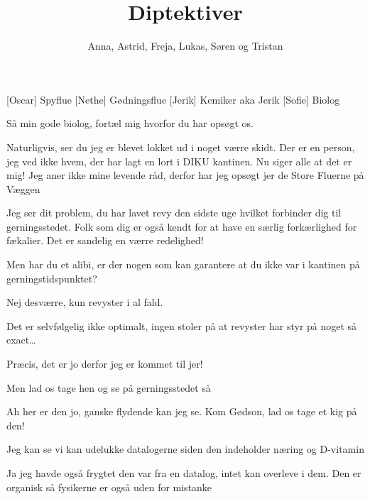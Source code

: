 \documentclass[a4paper,11pt]{article}
\title{Diptektiver}
\author{Anna, Astrid, Freja, Lukas, Søren og Tristan}
\begin{document}
\maketitle

\begin{roles}
    [Oscar] Spyflue
    [Nethe] Gødningsflue
    [Jerik] Kemiker aka Jerik
    [Sofie] Biolog
\end{roles}

\begin{sketch}



 Så min gode biolog, fortæl mig hvorfor du har opsøgt os.

 Naturligvis, ser du jeg er blevet lokket ud i noget værre skidt. Der er en person, jeg ved ikke hvem, der har lagt en lort i DIKU kantinen. Nu siger alle at det er mig! Jeg aner ikke mine levende råd, derfor har jeg opsøgt jer de Store Fluerne på Væggen

 Jeg ser dit problem, du har lavet revy den sidste uge hvilket forbinder dig til gerningsstedet. Folk som dig er også kendt for at have en særlig forkærlighed for fækalier. Det er sandelig en værre redelighed!

 Men har du et alibi, er der nogen som kan garantere at du ikke var i kantinen på gerningstidspunktet?

 Nej desværre, kun revyster i al fald.

 Det er selvfølgelig ikke optimalt, ingen stoler på at revyster har styr på noget så exact…

 Præcis, det er jo derfor jeg er kommet til jer!

 Men lad os tage hen og se på gerningsstedet så


 Ah her er den jo, ganske flydende kan jeg se. Kom Gødson, lad os tage et kig på den!


 Jeg kan se vi kan udelukke datalogerne siden den indeholder næring og D-vitamin

 Ja jeg havde også frygtet den var fra en datalog, intet kan overleve i dem. Den er organisk så fysikerne er også uden for mistanke


\end{sketch}
\end{document}
